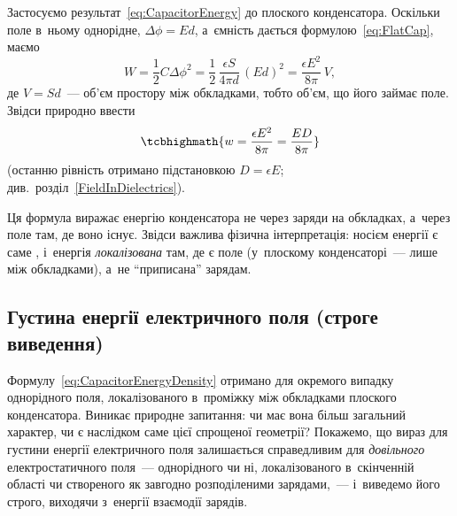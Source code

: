 Застосуємо результат~\eqref{eq:CapacitorEnergy} до плоского конденсатора. Оскільки поле
в~ньому однорідне, $\Delta\phi = Ed$, а~ємність дається формулою~\eqref{eq:FlatCap}, маємо
\begin{equation*}
	W = \frac12 C \Delta\phi^2 = \frac12\,\frac{\epsilon S}{4\pi d}\,(Ed)^2 = \frac{\epsilon E^2}{8\pi}\, V,
\end{equation*}
де $V = Sd$~--- об'єм простору між обкладками, тобто об'єм, що його займає поле. Звідси
природно ввести 
\begin{equation}\label{eq:CapacitorEnergyDensity}
	\tcbhighmath{
		w = \frac{\epsilon E^2}{8\pi} = \frac{ED}{8\pi}
	}
\end{equation}
(останню рівність отримано підстановкою $D = \epsilon E$;
див.~розділ~\ref{FieldInDielectrics}).

Ця формула виражає енергію конденсатора не через заряди на обкладках, а~через поле там,
де воно існує. Звідси важлива фізична інтерпретація: носієм енергії є саме ,
і~енергія \emph{локалізована} там, де є поле (у~плоскому конденсаторі~--- лише між
обкладками), а~не \enquote{приписана} зарядам.



\subsection*{Густина енергії електричного поля (строге виведення)}\label{sec:FieldEnergyDensityStrict}



Формулу~\eqref{eq:CapacitorEnergyDensity} отримано для окремого випадку однорідного поля,
локалізованого в~проміжку між обкладками плоского конденсатора. Виникає природне
запитання: чи має вона більш загальний характер, чи є наслідком саме цієї спрощеної
геометрії? Покажемо, що вираз для густини енергії електричного поля залишається
справедливим для \emph{довільного} електростатичного поля~--- однорідного чи ні,
локалізованого в~скінченній області чи створеного як завгодно розподіленими зарядами,~---
і~виведемо його строго, виходячи з~енергії взаємодії зарядів.

